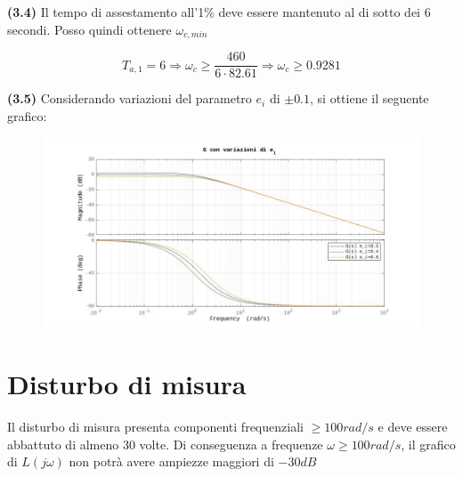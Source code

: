 \documentclass[a4paper,12pt,italian]{article}
\begin{document}
\textbf{(3.4)} Il tempo di assestamento all'1\% deve essere mantenuto al di sotto dei 6 secondi.
Posso quindi ottenere $ \omega_{c,min} $

\begin{equation*}
    T_{a,1} = 6 
    \Longrightarrow 
    \omega_c \ge \frac{460}{6 \cdot 82.61}
    \Longrightarrow
    \omega_c \ge 0.9281
\end{equation*}

\newpage

\textbf{(3.5)} Considerando variazioni del parametro $e_i$ di $\pm 0.1$, si ottiene il seguente grafico:

\begin{figure}[h!]
    \begin{center}
        \includegraphics[scale=0.5]{img/bode_GG_ei.jpg}
    \end{center}    
\end{figure}

\section{Disturbo di misura}

Il disturbo di misura presenta componenti frequenziali $\geq 100 rad/s$ e deve essere abbattuto di almeno 30 volte.
Di conseguenza a frequenze $\omega \geq 100 rad/s$, il grafico di $L(j\omega)$ non potrà avere ampiezze maggiori di $-30dB$
\end{document}
